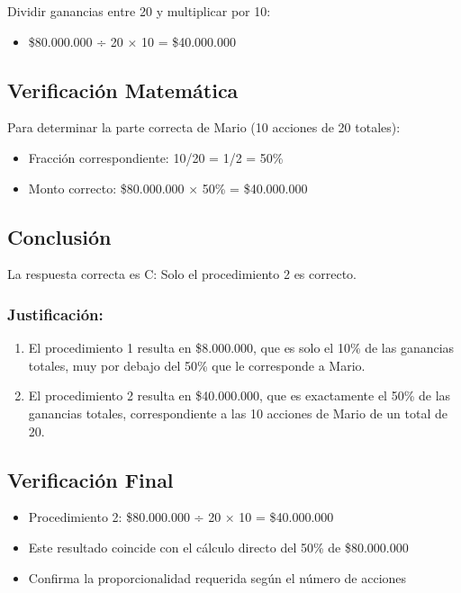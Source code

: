 \documentclass[
]{article}
\providecommand{\tightlist}{%
  \setlength{\itemsep}{0pt}\setlength{\parskip}{0pt}}
\begin{document}
Dividir ganancias entre 20 y multiplicar por 10:

\begin{itemize}
\tightlist
\item
  \$80.000.000 ÷ 20 × 10 = \$40.000.000
\end{itemize}

\subsection{Verificación
Matemática}\label{verificaciuxf3n-matemuxe1tica}

Para determinar la parte correcta de Mario (10 acciones de 20 totales):

\begin{itemize}
\tightlist
\item
  Fracción correspondiente: 10/20 = 1/2 = 50\%
\item
  Monto correcto: \$80.000.000 × 50\% = \$40.000.000
\end{itemize}

\subsection{Conclusión}\label{conclusiuxf3n-5}

La respuesta correcta es C: Solo el procedimiento 2 es correcto.

\subsubsection{Justificación:}\label{justificaciuxf3n-2}

\begin{enumerate}
\def\labelenumi{\arabic{enumi}.}
\item
  El procedimiento 1 resulta en \$8.000.000, que es solo el 10\% de las
  ganancias totales, muy por debajo del 50\% que le corresponde a Mario.
\item
  El procedimiento 2 resulta en \$40.000.000, que es exactamente el 50\%
  de las ganancias totales, correspondiente a las 10 acciones de Mario
  de un total de 20.
\end{enumerate}

\subsection{Verificación Final}\label{verificaciuxf3n-final}

\begin{itemize}
\tightlist
\item
  Procedimiento 2: \$80.000.000 ÷ 20 × 10 = \$40.000.000
\item
  Este resultado coincide con el cálculo directo del 50\% de
  \$80.000.000
\item
  Confirma la proporcionalidad requerida según el número de acciones
\end{itemize}
\end{document}

